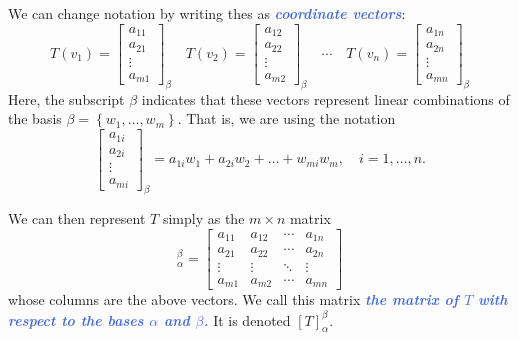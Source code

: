 \documentclass[10pt]{article}
\newcommand{\demph}[1]{\textcolor{RoyalBlue}{\textbf{\slshape #1}}} %
\theoremstyle{definition}
\begin{document}
We can change notation by writing thes as \demph{coordinate vectors}:
\begin{equation*}
  T(v_{1}) =
  \begin{bmatrix}
    a_{11}\\a_{21}\\\vdots \\a_{m1}
  \end{bmatrix}_{\beta}
  \quad
  T(v_{2}) =
  \begin{bmatrix}
    a_{12}\\a_{22}\\\vdots \\a_{m2}
  \end{bmatrix}_{\beta}
  \quad
  \cdots
  \quad
  T(v_{n}) =
  \begin{bmatrix}
    a_{1n}\\a_{2n}\\\vdots \\a_{mn}
  \end{bmatrix}_{\beta}
\end{equation*}
Here, the subscript $\beta$ indicates that these vectors represent linear
combinations of the basis $\beta=\left\{w_{1},\ldots,w_{m}\right\}$. That is,
we are using the notation
\begin{equation*}
  \begin{bmatrix}
    a_{1i}\\a_{2i}\\\vdots \\a_{mi}
  \end{bmatrix}_{\beta} = a_{1i}w_{1}+a_{2i}w_{2}+\ldots+w_{mi}w_{m}, \quad i=1,\ldots,n.
\end{equation*}


We can then represent $T$ simply as the $m\times n$ matrix
\begin{equation*}
  [T]_{\alpha}^{\beta}=
  \begin{bmatrix}
    a_{11}&a_{12}&\cdots& a_{1n}\\
    a_{21}&a_{22}&\cdots& a_{2n}\\
    \vdots&\vdots&\ddots&\vdots\\
    a_{m1}&a_{m2}&\cdots& a_{mn}
  \end{bmatrix}
\end{equation*}
whose columns are the above vectors. We call this matrix \demph{the matrix of
  $T$ with respect to the bases $\alpha$ and $\beta$.} It is denoted
$[T]_{\alpha}^{\beta}$. 
\end{document}
